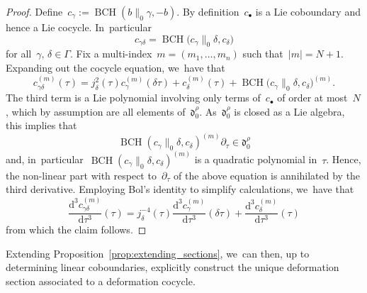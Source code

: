 \documentclass[JEP,XML,SOM,Unicode,published]{cedram}
\let\oldbullet\bullet
\renewcommand{\bullet}{{\scriptscriptstyle\oldbullet}}
\theoremstyle{plain}
\theoremstyle{definition}
\newcommand{\tx}{\text}
\newcommand{\frakd}{\ensuremath{\mathfrak{d}}}
\newcommand{\rmd}{\ensuremath{\mathrm{d}}}
\let\Ga\Gamma
\let\ga\gamma
\DeclareMathOperator{\BCH}{BCH}
\newcommand{\dtau}{\rmd \tau}
\begin{document}
\begin{proof}
Define~$c_\ga:=\BCH(b\|_0\ga,-b)$. By definition~$c_\bullet$ is a Lie coboundary and hence a Lie cocycle. In~particular
\begin{equation*}c_{\ga\delta} = \BCH\bigl(c_\ga\big\|_0\delta,c_\delta\bigr)\end{equation*}
for all~$\ga,\,\delta\in\Ga$. Fix a multi-index~$m=(m_1,\ldots,m_n)$ such that~$|m|=N+1$.
Expanding out the cocycle equation, we~have that
\begin{equation*}c_{\ga\delta}^{(m)}(\tau) = j_\delta^2(\tau) c_\ga^{(m)}(\delta\tau) + c_\delta^{(m)}(\tau) + \BCH\bigl(c_\ga\big\|_0\delta,c_\delta\bigr)^{(m)}\tx{.}\end{equation*}
The third term is a Lie polynomial involving only terms of~$c_\bullet$ of order at most~$N$, which by assumption are all elements of~$\frakd_0^\rho$. As~$\frakd_0^\rho$ is closed as a Lie algebra, this implies that
\begin{equation*}\BCH(c_\ga\big\|_0\delta,c_\delta)^{(m)}\partial_\tau \in\frakd_0^\rho\end{equation*}
and, in~particular~$\BCH(c_\ga\big\|_0\delta,c_\delta)^{(m)}$ is a quadratic polynomial in~$\tau$. Hence, the non-linear part with respect to~$\partial_\tau$ of the above equation is annihilated by the third derivative. Employing Bol's identity to simplify calculations, we~have that
\begin{equation*}
\frac{\rmd^3 c_{\ga\delta}^{(m)}}{\dtau^3}(\tau)
=
j_\delta^{-4}(\tau)\frac{\rmd^3 c_{\ga}^{(m)}}{\dtau^3}(\delta\tau) + \frac{\rmd^3 c_{\delta}^{(m)}}{\dtau^3}(\tau)
\end{equation*}
from which the claim follows.
\end{proof}

Extending Proposition~\ref{prop:extending_sections}, we~can then, up to determining linear coboundaries, explicitly construct the unique deformation section associated to a deformation cocycle.
\end{document}
